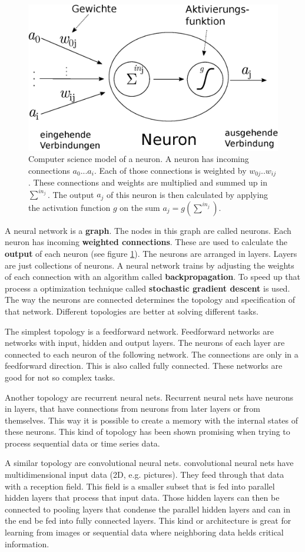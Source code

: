 \documentclass[jou,apacite]{apa6}
\begin{document}
\begin{figure}[!htb]
\centering
\includegraphics[width=.3\textwidth]{neuron.eps}
\caption[Computer science neuron abstraction]{Computer science model of a neuron. A neuron has incoming connections $a_0 ... a_i$. Each of those connections is weighted by $w_{0j} .. w_{ij}$. These connections and weights are multiplied and summed up in $\sum^{in_j}$. The output $a_j$ of this neuron is then calculated by applying the activation function $g$ on the sum $a_j = g(\sum^{in_j})$.}
\label{fig:neuron}
\end{figure}

A neural network is a \textbf{graph}. The nodes in this graph are called neurons. Each neuron has incoming \textbf{weighted connections}. These are used to calculate the \textbf{output} of each neuron (see figure \ref{fig:neuron}). The neurons are arranged in layers. Layers are just collections of neurons. A neural network trains by adjusting the weights of each connection with an algorithm called \textbf{backpropagation}. To speed up that process a optimization technique called \textbf{stochastic gradient descent} is used. The way the neurons are connected determines the topology and specification of that network. Different topologies are better at solving different tasks.

The simplest topology is a feedforward network. Feedforward networks are networks with input, hidden and output layers. The neurons of each layer are connected to each neuron of the following network. The connections are only in a feedforward direction. This is also called fully connected. These networks are good for not so complex tasks.

Another topology are recurrent neural nets. Recurrent neural nets have neurons in layers, that have connections from neurons from later layers or from themselves. This way it is possible to create a memory with the internal states of these neurons. This kind of topology has been shown promising when trying to process sequential data or time series data.

A similar topology are convolutional neural nets. convolutional neural nets have multidimensional input data (2D, e.g. pictures). They feed through that data with a reception field. This field is a smaller subset that is fed into parallel hidden layers that process that input data. Those hidden layers can then be connected to pooling layers that condense the parallel hidden layers and can in the end be fed into fully connected layers. This kind or architecture is great for learning from images or sequential data where neighboring data helds critical information.
\end{document}
